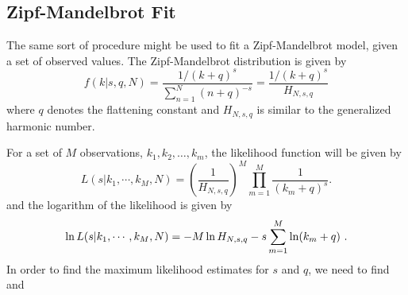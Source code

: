 







\subsection{Zipf-Mandelbrot Fit}
The same sort of procedure might be used to fit a Zipf-Mandelbrot model, given a set of observed values.
The Zipf-Mandelbrot distribution is given by
\begin{equation}
f(k | s, q, N) = \frac{1/(k+q)^s}{\sum_{n=1}^{N} (n+q)^{-s} } = \frac{1/(k+q)^s}{H_{N,s,q}}
\end{equation}
where $q$ denotes the flattening constant and $H_{N,s,q}$ is similar to the generalized harmonic number.

For a set of $M$ observations, $k_1, k_2, \ldots, k_m$, the likelihood function will be given by
\begin{equation}
L(s|k_1,\cdots,k_M,N) = \left( \frac{1}{H_{N,s,q}} \right)^M \prod_{m=1}^{M} \frac{1}{(k_m+q)^s} .
\end{equation}
and the logarithm of the likelihood is given by
\begin{equation}
\ln L(s|k_1,\cdots,k_M,N) = -M \ln H_{N,s,q} - s \sum_{m=1}^{M} \ln (k_m+q) \textmd{ .} 
\end{equation}
In order to find the maximum likelihood estimates for $s$ and $q$, we need to find 
and


